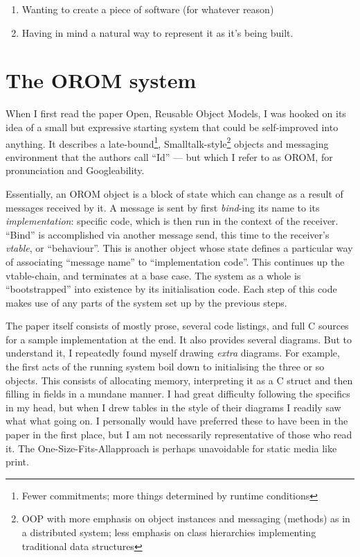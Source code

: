 \begin{enumerate}
\def\labelenumi{\alph{enumi})}
\tightlist
\item
  Wanting to create a piece of software (for whatever reason)
\item
  Having in mind a natural way to represent it as it's being built.
\end{enumerate}

\hypertarget{the-orom-system}{%
\section{The OROM system}\label{the-orom-system}}

When I first read the paper Open, Reusable Object Models, I was hooked
on its idea of a small but expressive starting system that could be
self-improved into anything. It describes a late-bound\footnote{Fewer
  commitments; more things determined by runtime conditions},
Smalltalk-style\footnote{OOP with more emphasis on object instances and
  messaging (methods) as in a distributed system; less emphasis on class
  hierarchies implementing traditional data structures} objects and
messaging environment that the authors call ``Id'' --- but which I refer
to as OROM, for pronunciation and Googleability.

Essentially, an OROM object is a block of state which can change as a
result of messages received by it. A message is sent by first
\emph{bind}-ing its name to its \emph{implementation}: specific code,
which is then run in the context of the receiver. ``Bind'' is
accomplished via another message send, this time to the receiver's
\emph{vtable}, or ``behaviour''. This is another object whose state
defines a particular way of associating ``message name'' to
``implementation code''. This continues up the vtable-chain, and
terminates at a base case. The system as a whole is ``bootstrapped''
into existence by its initialisation code. Each step of this code makes
use of any parts of the system set up by the previous steps.

The paper itself consists of mostly prose, several code listings, and
full C sources for a sample implementation at the end. It also provides
several diagrams. But to understand it, I repeatedly found myself
drawing \emph{extra} diagrams. For example, the first acts of the
running system boil down to initialising the three or so objects. This
consists of allocating memory, interpreting it as a C struct and then
filling in fields in a mundane manner. I had great difficulty following
the specifics in my head, but when I drew tables in the style of their
diagrams I readily saw what what going on. I personally would have
preferred these to have been in the paper in the first place, but I am
not necessarily representative of those who read it. The
One-Size-Fits-Allapproach is perhaps unavoidable for static media like
print.

